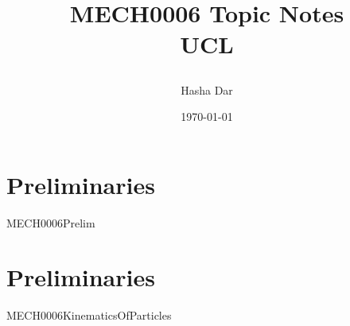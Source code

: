 \documentclass[12pt,a4paper, twoside]{report}
\begin{document}
\title{
  {MECH0006 Topic Notes}\\
  {\large UCL}
  \author{Hasha Dar}
  \date{\today}
}
\maketitle

\tableofcontents
\chapter{Preliminaries}
{MECH0006Prelim}

\chapter{Preliminaries}
{MECH0006KinematicsOfParticles}
\end{document}
